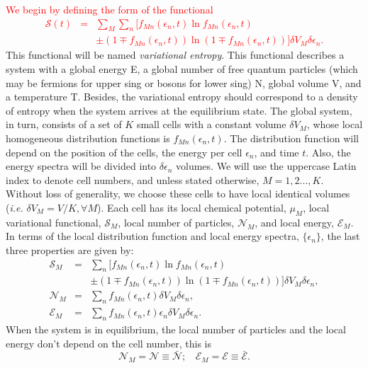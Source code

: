 \documentclass{article}
\newcommand{\Sm}{\Ss_M}
\newcommand{\de}{\delta}
\newcommand{\Ss}{\mathcal{S}}
\begin{document}
\textcolor{red}{We begin by defining the form of the functional 
\begin{eqnarray}
    \Ss (t)&=&\sum_{M} \sum_{n} [ f_{Mn}(\epsilon_{n},t) \ln f_{Mn}(\epsilon_{n},t)\nonumber \\
    &&\pm (1 \mp f_{Mn}(\epsilon_{n},t)) \ln (1 \mp f_{Mn}(\epsilon_{n},t)) ]   \delta V_M \delta \epsilon_n \label{entropy}.
\end{eqnarray}}
This functional will be named \textit{variational entropy}.
This functional describes a system with a global energy E, a global number of free
quantum particles (which may be fermions for upper sing or bosons for lower sing) N, global volume V, and a temperature T. 
Besides, the variational entropy should correspond to a density of entropy when the system arrives at the equilibrium state. The
global system, in turn, consists of a set of $K$ small cells with a constant volume $\delta V_M$, whose local homogeneous distribution functions is $f_{Mn}(\epsilon_{n},t)$. The distribution function will depend on the position of the cells, the energy per cell $\epsilon_{n}$, and time $t$. Also, the energy spectra will be divided into $\delta \epsilon_n$ volumes. We will use the uppercase Latin index to denote cell numbers, and unless stated otherwise, $M = 1, 2 . . . , K$. Without loss of generality, we choose these cells to have
local identical volumes (\textit{i.e.} $\delta V_M = V/K, \forall M$). Each cell has its local chemical potential, $\mu_M$, local
variational functional, $\Sm$, local number of particles, $\mathcal{N}_M$, and local energy, $\mathcal{E}_M$. In terms of the local distribution 
function and local energy spectra, $\{\epsilon_{n}\}$, the last three properties are given by:
\begin{eqnarray}
    \Sm &=&  \sum_{n} [ f_{Mn}(\epsilon_{n},t) \ln f_{Mn}(\epsilon_{n},t)\nonumber \\
    &&\pm (1 \mp f_{Mn}(\epsilon_{n},t)) \ln (1 \mp f_{Mn}(\epsilon_{n},t)) ] \de V_M \delta \epsilon_n \label{entropycell},\\
    {\mathcal{N}}_M&=& \sum_{n}f_{Mn}(\epsilon_{n} ,t) \de V_M \delta \epsilon_n, \nonumber \\
{\mathcal{E}}_M&=& \sum_{n}f_{Mn}(\epsilon_{n},t)\epsilon_{n} \de V_M \delta \epsilon_n.
\end{eqnarray}
When the system is in equilibrium, the local number of particles and the local energy don't depend on the cell number, this is
\begin{equation}
   {\mathcal{N}}_M=\mathcal{N}\equiv \bar{\mathcal{N}}; \ \ \ \  {\mathcal{E}}_M=\mathcal{E}\equiv \bar{\mathcal{E}}.
\end{equation}
\end{document}
